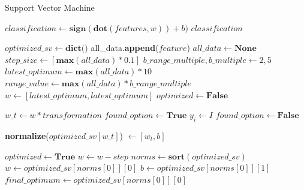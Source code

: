 \documentclass[12pt,a4paper,final]{report}
\begin{document}
\begin{algorithm}
\caption{Support Vector Machine}
\begin{algorithmic}[1]

\State $classification \leftarrow \textbf{sign}(\textbf{dot}(features,w)) + b)$
\State \Return $classification$
\EndFunction

\State $optimized\_sv \leftarrow \textbf{dict()}$
			\State all\_data.\textbf{append}($feature$)
		\EndFor
	\EndFor
\EndFor
\State $all\_data \leftarrow \textbf{None}$
\State $step\_size \leftarrow [\textbf{max}(all\_data)*0.1]$
\State $b\_range\_multiple, b\_multiple \leftarrow 2, 5$
\State $latest\_optimum \leftarrow \textbf{max}(all\_data) * 10$ 
\State $range\_value \leftarrow \textbf{max}(all\_data) * b\_range\_multiple$
	\State $w \leftarrow [latest\_optimum,latest\_optimum]$ 
	\State $optimized \leftarrow \textbf{False}$
	
				\State $w\_t \leftarrow w * transformation		$	
				\State $found\_option \leftarrow \textbf{True}$
						\State $y_i \leftarrow I$ 		
						\State $found\_option \leftarrow \textbf{False}$
						\EndIf
									
					\EndFor
				\EndFor			
					\State \textbf{normalize}($optimized\_sv[w\_t]$) $\leftarrow [w_t, b]$ 			 	
				\EndIf			
			\EndFor		
	
	\EndFor
		\State $optimized \leftarrow \textbf{True}$	
	\Else
		\State $w \leftarrow w - step$
	\EndIf
	\EndWhile
	\State $norms \leftarrow \textbf{sort}(optimized\_sv)$
	\State $w \leftarrow optimized\_sv[norms[0]][0]$
	\State $b \leftarrow optimized\_sv[norms[0]][1]$
	\State $final\_optimum \leftarrow optimized\_sv[norms[0]][0]$
\EndFor
	
\EndFunction
\end{algorithmic}
\end{algorithm}
\end{document}
